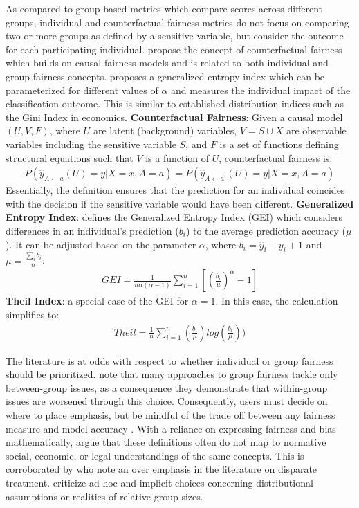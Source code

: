 As compared to group-based metrics which compare scores across different groups, individual and counterfactual fairness metrics do not focus on comparing two or more groups as defined by a sensitive variable, but consider the outcome for each participating individual.  propose the concept of counterfactual fairness which builds on causal fairness models and is related to both individual and group fairness concepts.  proposes a generalized entropy index which can be parameterized for different values of $\alpha$ and measures the individual impact of the classification outcome. This is similar to established distribution indices such as the Gini Index in economics.
\textbf{Counterfactual Fairness}: Given a causal model $(U,V,F)$, where $U$ are latent (background) variables, $V = S \cup X$ are observable variables including the sensitive variable $S$, and $F$ is a set of functions defining structural equations such that $V$ is a function of $U$, counterfactual fairness is:
\begin{align} 
    P(\hat{y}_{A \leftarrow a}(U) = y | X = x, A=a ) = P(\hat{y}_{A \leftarrow a^{'}}(U) = y | X = x, A=a )
\end{align}
Essentially, the definition ensures that the prediction for an individual coincides with the decision if the sensitive variable would have been different.
\textbf{Generalized Entropy Index}:  defines the Generalized Entropy Index (GEI) which considers differences in an individual's prediction ($b_i$) to the average prediction accuracy ($\mu$). It can be adjusted based on the parameter $\alpha$, where $b_i=\hat{y}_i-y_i+1$ and $\mu=\frac{\sum_i b_i}{n}$: 
\begin{align}
    GEI = \frac{1}{n\alpha(\alpha-1)}\sum_{i=1}^{n}\left[ (\frac{b_i}{\mu})^\alpha -1\right]
\end{align}
\textbf{Theil Index}: a special case of the GEI for $\alpha = 1$. In this case, the calculation simplifies to:
\begin{align}
    Theil = \frac{1}{n}\sum_{i=1}^{n}(\frac{b_i}{\mu})log(\frac{b_i}{\mu}))
\end{align}

The literature is at odds with respect to whether individual or group fairness should be prioritized.  note that many approaches to group fairness tackle only between-group issues, as a consequence they demonstrate that within-group issues are worsened through this choice. Consequently, users must decide on where to place emphasis, but be mindful of the trade off between any fairness measure and model accuracy . With a reliance on expressing fairness and bias mathematically,  argue that these definitions often do not map to normative social, economic, or legal understandings of the same concepts. This is corroborated by  who note an over emphasis in the literature on disparate treatment.  criticize ad hoc and implicit choices concerning distributional assumptions or realities of relative group sizes.


